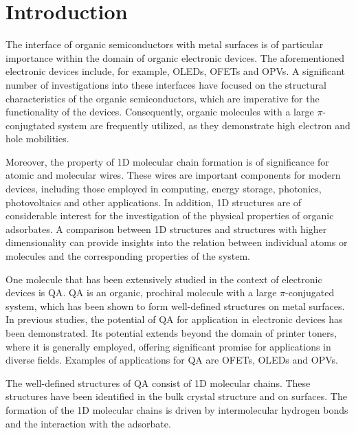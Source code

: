 \chapter{Introduction}

The interface of organic semiconductors with metal surfaces is of particular importance within the domain of organic electronic devices. The aforementioned electronic devices include, for example, \acp{OLED},\autocite{Wang2012, Facchetti2007} \acp{OFET}\autocite{Kulkarni2004, Shahnawaz2019} and \acp{OPV}.\autocite{Hains2010} A significant number of investigations into these interfaces have focused on the structural characteristics of the organic semiconductors, which are imperative for the functionality of the devices. Consequently, organic molecules with a large $\pi$-conjugtated system are frequently utilized, as they demonstrate high electron and hole mobilities.

Moreover, the property of 1D molecular chain formation is of significance for atomic and molecular wires. These wires are important components for modern devices, including those employed in computing, energy storage, photonics, photovoltaics and other applications.\autocite{Goktas2018, Zhou2019, Jia2019, Daniels2023, Gu2023, Patzsch2017, Imran2018} In addition, 1D structures are of considerable interest for the investigation of the physical properties of organic adsorbates. A comparison between 1D structures and structures with higher dimensionality can provide insights into the relation between individual atoms or molecules and the corresponding properties of the system.

One molecule that has been extensively studied in the context of electronic devices is \ac{QA}. \Ac{QA} is an organic, prochiral molecule with a large $\pi$-conjugated system, which has been shown to form well-defined structures on metal surfaces. In previous studies, the potential of \ac{QA} for application in electronic devices has been demonstrated.\autocite{Glowacki2013,DanielGlowacki2012, Wang2016} Its potential extends beyond the domain of printer toners, where it is generally employed, offering significant promise for applications in diverse fields. Examples of applications for \ac{QA} are \acp{OFET}\autocite{Jeon2018, Jeong2017, Kanbur2019, Berg2009}, \acp{OLED}\autocite{Wang2016a, Min2021, Cunha2018} and \acp{OPV}\autocite{Dunst2017, Sung2017}.

The well-defined structures of \ac{QA} consist of 1D molecular chains. These structures have been identified in the bulk crystal structure\autocite{Paulus2007} and on surfaces.\autocite{Humberg2024, Wagner2014, Trixler2007, Eberle2019} The formation of the 1D molecular chains is driven by intermolecular hydrogen bonds and the interaction with the adsorbate.\autocite{Humberg2024, Humberg2020}

